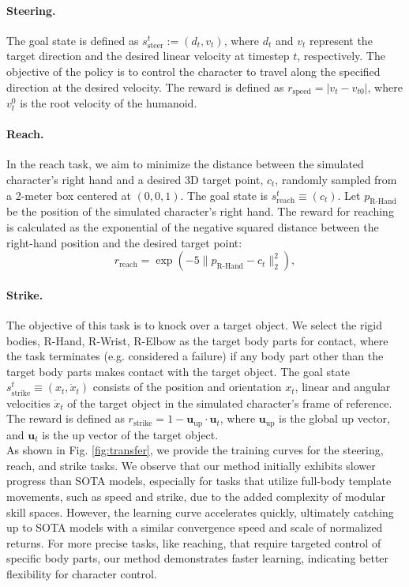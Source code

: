 \paragraph{Steering.} The goal state is defined as \( s_{\text{steer}}^t := (d_t, v_t) \), where \( d_t \) and \( v_t \)  represent the target direction and the desired linear velocity at timestep \( t \), respectively. The objective of the policy is to control the character to travel along the specified direction at the desired velocity. The reward is defined as \( r_{\text{speed}} = |v_t - v_{t0}| \), where \( v_{t}^{0} \) is the root velocity of the humanoid.

\paragraph{Reach.} In the reach task, we aim to minimize the distance between the simulated character's right hand and a desired 3D target point, \( c_t \), randomly sampled from a 2-meter box centered at \( (0, 0, 1) \). The goal state is \( s_{\text{reach}}^t \equiv (c_t) \). Let \( p_{\text{R-Hand}} \) be the position of the simulated character's right hand. The reward for reaching is calculated as the exponential of the negative squared distance between the right-hand position and the desired target point: 
\[
r_{\text{reach}} = \exp\left(-5 \| p_{\text{R-Hand}} - c_t \|_2^2 \right),
\]

\paragraph{Strike.} The objective of this task is to knock over a target object. We select the rigid bodies, R-Hand, R-Wrist, R-Elbow as the target body parts for contact, where the task terminates (e.g. considered a failure) if any body part other than the target body parts makes contact with the target object. The goal state \( s_{\text{strike}}^t \equiv (x_t, \dot{x}_t) \) consists of the position and orientation \( x_t \), linear and angular velocities \( \dot{x}_t \) of the target object in the simulated character's frame of reference. The reward is defined as \( r_{\text{strike}} = 1 - \mathbf{u}_{\text{up}} \cdot \mathbf{u}_t \), where \( \mathbf{u}_{\text{up}} \) is the global up vector, and \( \mathbf{u}_t \) is the up vector of the target object.\\

\noindent As shown in Fig. \ref{fig:transfer}, we provide the training curves for the steering, reach, and strike tasks. We observe that our method initially exhibits slower progress than SOTA models, especially for tasks that utilize full-body template movements, such as speed and strike, due to the added complexity of modular skill spaces. However, the learning curve accelerates quickly, ultimately catching up to SOTA models with a similar convergence speed and scale of normalized returns. For more precise tasks, like reaching, that require targeted control of specific body parts, our method demonstrates faster learning, indicating better flexibility for character control. 

